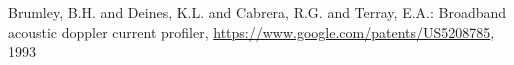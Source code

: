 \begin{thebibliography}{99}

  Brumley, B.H. and Deines, K.L. and Cabrera, R.G. and Terray, E.A.: Broadband acoustic doppler current profiler,  \url{https://www.google.com/patents/US5208785}, 1993


\end{thebibliography}

